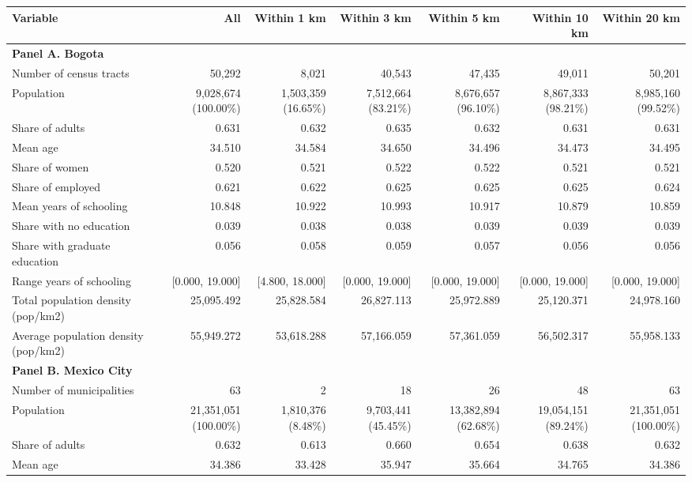 \begin{tabular}{lrrrrrr}
    \midrule
    \midrule
    \textbf{Variable} & \textbf{All} & \textbf{Within 1 km} & \textbf{Within 3 km} & \textbf{Within 5 km} & \textbf{Within 10 km} & \textbf{Within 20 km} \\
    \midrule
    \multicolumn{7}{l}{\textbf{Panel A. Bogota}} \\
    \midrule
    Number of census tracts & 50,292 & 8,021 & 40,543 & 47,435 & 49,011 & 50,201 \\
    Population & 9,028,674 (100.00\%) & 1,503,359 (16.65\%) & 7,512,664 (83.21\%) & 8,676,657 (96.10\%) & 8,867,333 (98.21\%) & 8,985,160 (99.52\%) \\
    Share of adults & 0.631 & 0.632 & 0.635 & 0.632 & 0.631 & 0.631 \\
    Mean age & 34.510 & 34.584 & 34.650 & 34.496 & 34.473 & 34.495 \\
    Share of women & 0.520 & 0.521 & 0.522 & 0.522 & 0.521 & 0.521 \\
    Share of employed & 0.621 & 0.622 & 0.625 & 0.625 & 0.625 & 0.624 \\
    Mean years of schooling & 10.848 & 10.922 & 10.993 & 10.917 & 10.879 & 10.859 \\
    Share with no education & 0.039 & 0.038 & 0.038 & 0.039 & 0.039 & 0.039 \\
    Share with graduate education & 0.056 & 0.058 & 0.059 & 0.057 & 0.056 & 0.056 \\
    Range years of schooling & [0.000, 19.000] & [4.800, 18.000] & [0.000, 19.000] & [0.000, 19.000] & [0.000, 19.000] & [0.000, 19.000] \\
    Total population density (pop/km2) & 25,095.492 & 25,828.584 & 26,827.113 & 25,972.889 & 25,120.371 & 24,978.160 \\
    Average population density (pop/km2) & 55,949.272 & 53,618.288 & 57,166.059 & 57,361.059 & 56,502.317 & 55,958.133 \\
    \midrule
    \multicolumn{7}{l}{\textbf{Panel B. Mexico City}} \\
    \midrule
    Number of municipalities & 63 & 2 & 18 & 26 & 48 & 63 \\
    Population & 21,351,051 (100.00\%) & 1,810,376 (8.48\%) & 9,703,441 (45.45\%) & 13,382,894 (62.68\%) & 19,054,151 (89.24\%) & 21,351,051 (100.00\%) \\
    Share of adults & 0.632 & 0.613 & 0.660 & 0.654 & 0.638 & 0.632 \\
    Mean age & 34.386 & 33.428 & 35.947 & 35.664 & 34.765 & 34.386 \\

\end{tabular}
